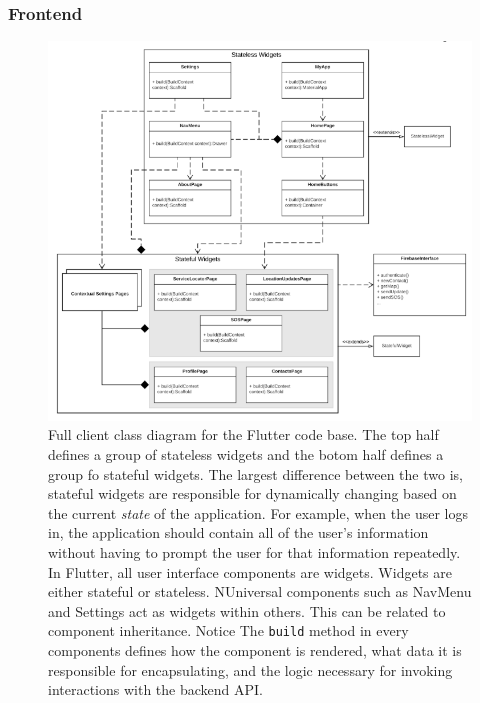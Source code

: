 \documentclass[10pt, a4paper]{article}
\begin{document}
\subsubsection{Frontend}
\begin{figure}[H]
  \centerline{
  	\includegraphics[scale=1.3]{diagrams/client-class-1.png}
  }  
  \caption{Full client class diagram for the Flutter code base. The top half defines a group of stateless widgets and the botom half defines a group fo stateful widgets. The largest difference between the two is, stateful widgets are responsible for dynamically changing based on the current \emph{state} of the application. For example, when the user logs in, the application should contain all of the user's information without having to prompt the user for that information repeatedly. In Flutter, all user interface components are widgets. Widgets are either stateful or stateless. NUniversal components such as NavMenu and Settings act as widgets within others. This can be related to component inheritance. Notice The \texttt{build} method in every components defines how the component is rendered, what data it is responsible for encapsulating, and the logic necessary for invoking interactions with the backend API.}
\end{figure}
\end{document}
